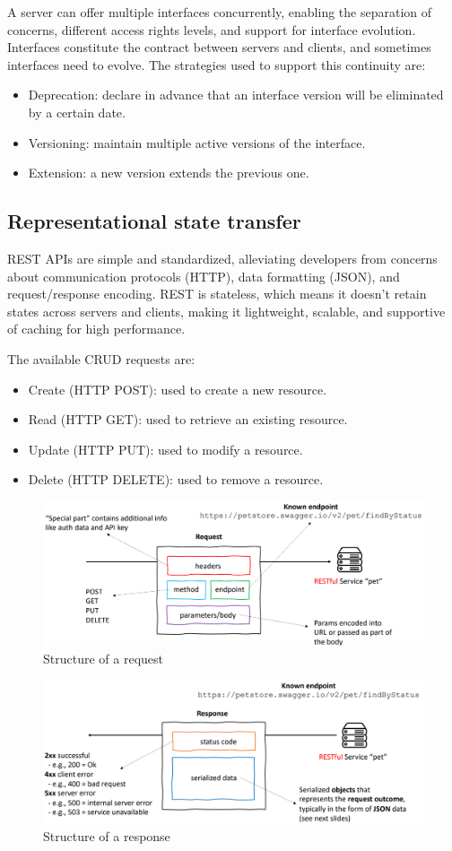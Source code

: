 A server can offer multiple interfaces concurrently, enabling the separation of concerns, different access rights levels, and support for interface evolution.
Interfaces constitute the contract between servers and clients, and sometimes interfaces need to evolve.
The strategies used to support this continuity are: 
\begin{itemize}
    \item Deprecation: declare in advance that an interface version will be eliminated by a certain date.
    \item Versioning: maintain multiple active versions of the interface.
    \item Extension: a new version extends the previous one. 
\end{itemize}

\subsection*{Representational state transfer}
REST APIs are simple and standardized, alleviating developers from concerns about communication protocols (HTTP), data formatting (JSON), and request/response encoding. 
REST is stateless, which means it doesn't retain states across servers and clients, making it lightweight, scalable, and supportive of caching for high performance.

The available CRUD requests are:
\begin{itemize}
    \item Create (HTTP POST): used to create a new resource.
    \item Read (HTTP GET): used to retrieve an existing resource.
    \item Update (HTTP PUT): used to modify a resource.
    \item Delete (HTTP DELETE): used to remove a resource.
\end{itemize}
\begin{figure}[H]
    \centering
    \includegraphics[width=0.75\linewidth]{images/rest.png}
    \caption{Structure of a request}
\end{figure}
\begin{figure}[H]
    \centering
    \includegraphics[width=0.75\linewidth]{images/rest1.png}
    \caption{Structure of a response}
\end{figure}

